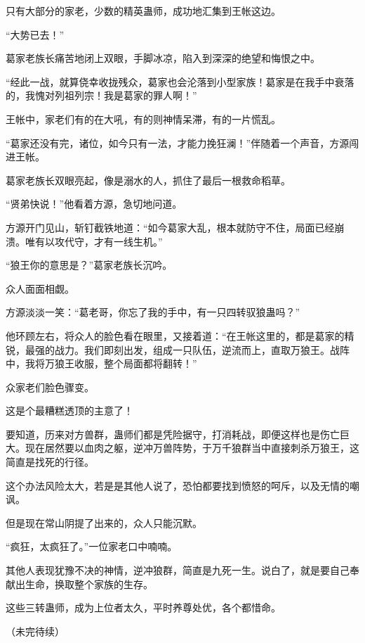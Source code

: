 \begin{this_body}
只有大部分的家老，少数的精英蛊师，成功地汇集到王帐这边。

“大势已去！”

葛家老族长痛苦地闭上双眼，手脚冰凉，陷入到深深的绝望和悔恨之中。

“经此一战，就算侥幸收拢残众，葛家也会沦落到小型家族！葛家是在我手中衰落的，我愧对列祖列宗！我是葛家的罪人啊！”

王帐中，家老们有的在大吼，有的则神情呆滞，有的一片慌乱。

“葛家还没有完，诸位，如今只有一法，才能力挽狂澜！”伴随着一个声音，方源闯进王帐。

葛家老族长双眼亮起，像是溺水的人，抓住了最后一根救命稻草。

“贤弟快说！”他看着方源，急切地问道。

方源开门见山，斩钉截铁地道：“如今葛家大乱，根本就防守不住，局面已经崩溃。唯有以攻代守，才有一线生机。”

“狼王你的意思是？”葛家老族长沉吟。

众人面面相觑。

方源淡淡一笑：“葛老哥，你忘了我的手中，有一只四转驭狼蛊吗？”

他环顾左右，将众人的脸色看在眼里，又接着道：“在王帐这里的，都是葛家的精锐，最强的战力。我们即刻出发，组成一只队伍，逆流而上，直取万狼王。战阵中，我将万狼王收服，整个局面都将翻转！”

众家老们脸色骤变。

这是个最糟糕透顶的主意了！

要知道，历来对方兽群，蛊师们都是凭险据守，打消耗战，即便这样也是伤亡巨大。现在居然要以血肉之躯，逆冲万兽阵势，于万千狼群当中直接刺杀万狼王，这简直是找死的行径。

这个办法风险太大，若是是其他人说了，恐怕都要找到愤怒的呵斥，以及无情的嘲讽。

但是现在常山阴提了出来的，众人只能沉默。

“疯狂，太疯狂了。”一位家老口中喃喃。

其他人表现犹豫不决的神情，逆冲狼群，简直是九死一生。说白了，就是要自己奉献出生命，换取整个家族的生存。

这些三转蛊师，成为上位者太久，平时养尊处优，各个都惜命。

（未完待续）

\end{this_body}

